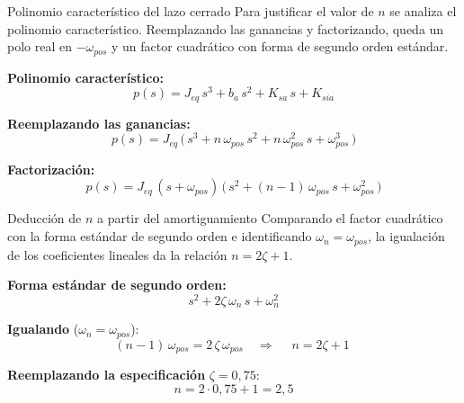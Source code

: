 \documentclass[aspectratio=169,t]{beamer}
\begin{document}
\begin{frame}{Polinomio característico del lazo cerrado}
{\small\color{uncGray}Para justificar el valor de $n$ se analiza el polinomio característico. Reemplazando las ganancias y factorizando, queda un polo real en $-\omega_{pos}$ y un factor cuadrático con forma de segundo orden estándar.}\par
\vspace{4mm}

\textbf{Polinomio característico:}
\begin{equation*}
p(s) = J_{eq}\,s^{3} + b_a\,s^{2} + K_{sa}\,s + K_{sia}
\end{equation*}

\textbf{Reemplazando las ganancias:}
\begin{equation*}
p(s) = J_{eq}\,\big(\,s^{3} + n\,\omega_{pos}\,s^{2} + n\,\omega_{pos}^{2}\,s + \omega_{pos}^{3}\,\big)
\end{equation*}

\textbf{Factorización:}
\begin{equation*}
p(s) = J_{eq}\,(s + \omega_{pos})\,\big(\,s^{2} + (n-1)\,\omega_{pos}\,s + \omega_{pos}^{2}\,\big)
\end{equation*}
\end{frame}

\begin{frame}{Deducción de $n$ a partir del amortiguamiento}
{\small\color{uncGray}Comparando el factor cuadrático con la forma estándar de segundo orden e identificando $\omega_n=\omega_{pos}$, la igualación de los coeficientes lineales da la relación $n = 2\zeta+1$.}\par
\vspace{4mm}

\textbf{Forma estándar de segundo orden:}
\begin{equation*}
s^{2} + 2\zeta\,\omega_n\,s + \omega_n^{2}
\end{equation*}

\textbf{Igualando} ($\omega_n = \omega_{pos}$):
\begin{equation*}
(n - 1)\,\omega_{pos} = 2\,\zeta\,\omega_{pos}
\quad\Longrightarrow\quad
\boxed{\;n = 2\zeta + 1\;}
\end{equation*}

\textbf{Reemplazando la especificación} $\zeta = 0{,}75$:
\begin{equation*}
n = 2\cdot 0{,}75 + 1 = 2{,}5
\end{equation*}
\end{frame}
\end{document}
